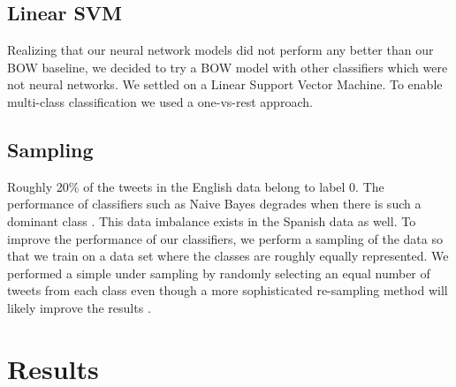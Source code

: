 \documentclass[11pt,a4paper]{article}
\begin{document}
\subsection{Linear SVM}
Realizing that our neural network models did not perform any better than our BOW baseline, we decided to try a BOW model with other classifiers which were not neural networks. We settled on a Linear Support Vector Machine. To enable multi-class classification we used a one-vs-rest approach. 

\subsection{Sampling}
Roughly 20\% of the tweets in the English data belong to label 0. The performance of classifiers such as Naive Bayes degrades when there is such a dominant class \cite{Rennie03}. This data imbalance exists in the Spanish data as well. To improve the performance of our classifiers, we perform a sampling of the data so that we train on a data set where the classes are roughly equally represented. We performed a simple under sampling by randomly selecting an equal number of tweets from each class even though a more sophisticated re-sampling method will likely improve the results \cite{Estabrooks:Resampling}. 


\section{Results}
\end{document}
